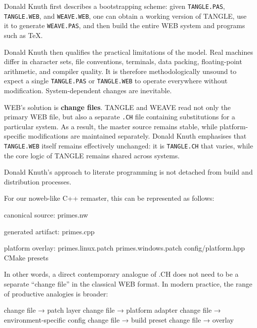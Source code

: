 \documentclass{ZGJournalArticle_2026}
\newenvironment{Shaded}{}{}
\newcommand{\NormalTok}[1]{#1}
\begin{document}
Donald Knuth first describes a bootstrapping scheme: given
\texttt{TANGLE.PAS}, \texttt{TANGLE.WEB}, and \texttt{WEAVE.WEB}, one
can obtain a working version of TANGLE, use it to generate
\texttt{WEAVE.PAS}, and then build the entire WEB system and programs
such as TeX.

Donald Knuth then qualifies the practical limitations of the model. Real
machines differ in character sets, file conventions, terminals, data
packing, floating-point arithmetic, and compiler quality. It is
therefore methodologically unsound to expect a single
\texttt{TANGLE.PAS} or \texttt{TANGLE.WEB} to operate everywhere without
modification. System-dependent changes are inevitable.

WEB's solution is \textbf{change files}. TANGLE and WEAVE read not only
the primary WEB file, but also a separate \texttt{.CH} file containing
substitutions for a particular system. As a result, the master source
remains stable, while platform-specific modifications are maintained
separately. Donald Knuth emphasises that \texttt{TANGLE.WEB} itself
remains effectively unchanged: it is \texttt{TANGLE.CH} that varies,
while the core logic of TANGLE remains shared across systems.

Donald Knuth's approach to literate programming is not detached from
build and distribution processes.

For our noweb-like C++ remaster, this can be represented as follows:

\begin{Shaded}
\begin{Highlighting}[]
\NormalTok{canonical source:}
\NormalTok{  primes.nw}

\NormalTok{generated artifact:}
\NormalTok{  primes.cpp}

\NormalTok{platform overlay:}
\NormalTok{  primes.linux.patch}
\NormalTok{  primes.windows.patch}
\NormalTok{  config/platform.hpp}
\NormalTok{  CMake presets}
\end{Highlighting}
\end{Shaded}

In other words, a direct contemporary analogue of .CH does not need to
be a separate ``change file'' in the classical WEB format. In modern
practice, the range of productive analogies is broader:

\begin{Shaded}
\begin{Highlighting}[]
\NormalTok{change file → patch layer}
\NormalTok{change file → platform adapter}
\NormalTok{change file → environment{-}specific config}
\NormalTok{change file → build preset}
\NormalTok{change file → overlay}
\end{Highlighting}
\end{Shaded}
\end{document}
